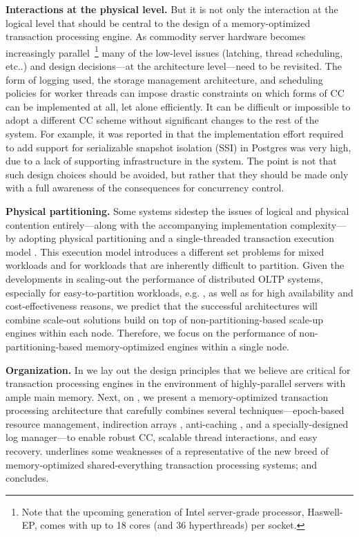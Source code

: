 \vspace{2mm}
{\bf Interactions at the physical level.} 
But it is not only the interaction at the logical level that should be central to the design of a memory-optimized transaction processing engine. As commodity server hardware becomes increasingly parallel~\footnote{Note that the upcoming generation of Intel server-grade processor, Haswell-EP, comes with up to 18 cores (and 36 hyperthreads) per socket.} many of the low-level issues (latching, thread scheduling, etc..) and design decisions---at the architecture level---need to be revisited. The form of logging used, the storage management architecture, and scheduling policies for worker threads can impose drastic constraints on which forms of CC can be implemented at all, let alone efficiently. 
It can be difficult or impossible to adopt a different CC scheme without significant changes to the rest of the system. 
For example, it was reported in \cite{PortsG12} that the implementation effort required to add support for serializable snapshot isolation (SSI) in Postgres was very high, due to a lack of supporting infrastructure in the system. 
The point is not that such design choices should be avoided, but rather that they should be made only with a full awareness of the consequences for concurrency control. 

\vspace{2mm}
{\bf Physical partitioning.} Some systems sidestep the issues of logical and physical contention entirely---along with the accompanying implementation complexity---by adopting physical partitioning and a single-threaded transaction execution model \cite{Kallman+08,KemperN11}. This execution model introduces a different set problems for mixed workloads and for workloads that are inherently difficult to partition.  Given the developments in scaling-out the performance of distributed OLTP systems, especially for easy-to-partition workloads, e.g. \cite{BailisFHGS14}, as well as for high availability and cost-effectiveness reasons, we predict that the successful architectures will combine scale-out solutions build on top of non-partitioning-based scale-up engines within each node.
Therefore, we focus on the performance of non-partitioning-based memory-optimized engines within a single node.

\vspace{2mm}
{\bf Organization.} 
In  we lay out the design principles that we believe are critical for transaction processing engines in the environment of highly-parallel servers with ample main memory. Next, on , we present a memory-optimized transaction processing architecture that carefully combines several techniques---epoch-based resource management, indirection arrays \cite{SadoghiRCB13}, anti-caching \cite{DeBrabantPTSZ13}, and a specially-designed log manager---to enable robust CC, scalable thread interactions, and easy recovery.  
 underlines some weaknesses of a representative of the new breed of memory-optimized shared-everything transaction processing systems; and  concludes.


